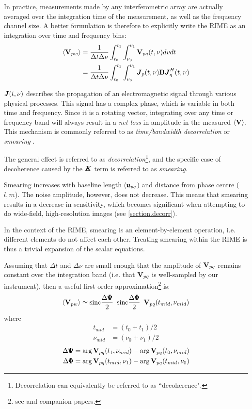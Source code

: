 \pg
In practice, measurements made by any interferometric array are actually averaged over the integration time of the measurement, as well as the frequency channel size. A better formulation is therefore to explicitly write the RIME as an integration over time and frequency bins:
\begin{align}
\langle \textbf{V}_{pw} \rangle &= \frac{1}{\Delta t \Delta \nu} \int_{t_0}^{t_1} \int_{\nu_0}^{\nu_1} \textbf{V}_{pq}(t,\nu) dv dt\\
                          &= \frac{1}{\Delta t \Delta \nu} \int_{t_0}^{t_1} \int_{\nu_0}^{\nu_1} \textbf{\emph{J}}_p(t,\nu) \textbf{B} \textbf{\emph{J}}_q^H(t,\nu)
\end{align}

\pg
$\textbf{\emph{J}}(t,\nu)$ describes the propagation of an electromagnetic signal through various physical processes. This signal has a complex phase, which is variable in both time and frequency. Since it is a rotating vector, integrating over any time or frequency band will always result in a \emph{net loss} in amplitude in the measured $\langle\textbf{V}\rangle$. This mechanism is commonly referred to as \emph{time/bandwidth decorrelation} or \emph{smearing} .

\pg
The general effect is referred to as \emph{decorrelation}\footnote{Decorrelation can equivalently be referred to as ``decoherence".}, and the specific case of decoherence caused by the $\textbf{\emph{K}}$ term is referred to as \emph{smearing}.

\pg Smearing increases with baseline length ($\pmb{u}_{pq}$) and distance from phase centre ($l,m$). The noise amplitude, however, does not decrease. This means that smearing results in a decrease in sensitivity, which becomes significant when attempting to do wide-field, high-resolution images (see \cref{section.decorr}).

\pg 
In the context of the RIME, smearing is an element-by-element operation, i.e. different elements do not affect each other. Treating smearing within the RIME is thus a trivial expansion of the scalar equations.

\pg
Assuming that $\Delta t$ and $\Delta \nu$ are small enough that the amplitude of $\textbf{V}_{pq}$ remains constant over the integration band (i.e. that $\textbf{V}_{pq}$ is well-sampled by our instrument), then a useful first-order approximation\footnote{see  and companion papers.} is:
\begin{equation}
\langle \textbf{V}_{pw} \rangle \simeq \text{sinc}\frac{\Delta \pmb{\Psi}}{2} \enskip \text{sinc}\frac{\Delta \pmb{\Phi}}{2} \enskip \textbf{V}_{pq}(t_{mid},\nu_{mid})
\end{equation}
where
\begin{align}
t_{mid}           &= (t_0 + t_1)/2\\
\nu_{mid}         &= (\nu_0 + \nu_1)/2
\end{align}
\begin{align}
\Delta \pmb{\Psi} &= \arg \textbf{V}_{pq}(t_1,\nu_{mid}) - \arg \textbf{V}_{pq}(t_0, \nu_{mid})\\
\Delta \pmb{\Phi} &= \arg \textbf{V}_{pq}(t_{mid},\nu_1) - \arg \textbf{V}_{pq}(t_{mid}, \nu_0)
\end{align}

